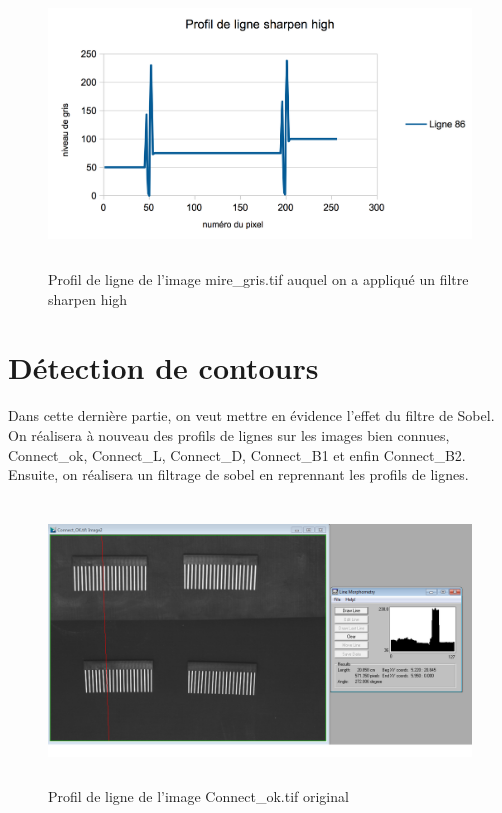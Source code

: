 \documentclass{scrreprt}
\begin{document}
\begin{figure}[!h]
\centering
\includegraphics[height=7.5cm,width=15cm]{images/profillignesharpenhigh.png}
\caption{Profil de ligne de l'image mire_gris.tif auquel on a appliqué un filtre sharpen high}
\end{figure}

\newpage
\section{Détection de contours}

Dans cette dernière partie, on veut mettre en évidence l'effet du filtre de Sobel. On réalisera 
à nouveau des profils de lignes sur les images bien connues, Connect_ok, Connect_L, Connect_D, Connect_B1
et enfin Connect_B2. Ensuite, on réalisera un filtrage de sobel en reprennant les profils de lignes. 


\begin{figure}[!h]
\centering
\includegraphics[height=7.5cm,width=15cm]{images/connectokline.png}
\caption{Profil de ligne de l'image Connect_ok.tif original}
\end{figure}
\end{document}
